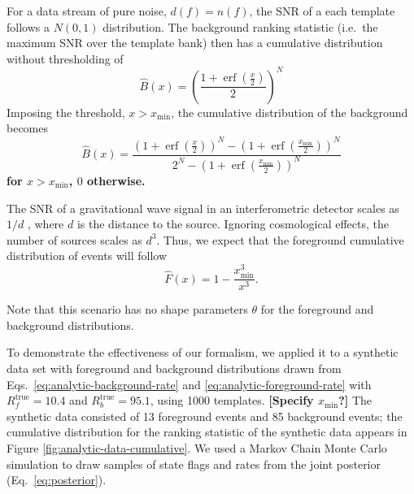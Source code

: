 \documentclass[aps,prd]{revtex4-1}
\newcommand{\xmin}{x_\mathrm{min}}
\newcommand{\ilya}[1]{{\color{red} \bf #1}}
\DeclareMathOperator{\erf}{erf}
\begin{document}
For a data stream of pure noise, $d(f) = n(f)$, the SNR of a each
template follows a $N(0,1)$ distribution.  The background ranking
statistic (i.e.\ the maximum SNR over the template bank) then has a
cumulative distribution without thresholding of
\begin{equation}
  \hat{B}(x) = \left( \frac{1 + \erf\left( \frac{x}{2}
      \right)}{2} \right)^N
\end{equation}
Imposing the threshold, $x > \xmin$, the
cumulative distribution of the background becomes
\begin{equation}
  \label{eq:analytic-background-rate}
  \hat{B}(x) = \frac{\left( 1 + \erf\left( \frac{x}{2} \right)
    \right)^N - \left( 1 + \erf\left( \frac{\xmin}{2} \right)
    \right)^N}{2^N - \left( 1 + \erf\left( \frac{\xmin}{2} \right)
    \right)^N }
\end{equation}
\ilya{for $x>\xmin$, $0$ otherwise.}

The SNR of a gravitational wave signal in an interferometric detector
scales as $1/d$ \citep{Finn1992}, where $d$ is the distance to the
source.  Ignoring cosmological effects, the number of sources scales
as $d^3$.  Thus, we expect that the foreground cumulative distribution
of events will follow
\begin{equation}
  \label{eq:analytic-foreground-rate}
  \hat{F}(x) = 1 - \frac{\xmin^3}{x^3}.
\end{equation}

Note that this scenario has no shape parameters $\theta$ for the foreground and
background distributions.

To demonstrate the effectiveness of our formalism, we applied it to a
synthetic data set with foreground and background distributions drawn
from Eqs.~\eqref{eq:analytic-background-rate} and
\eqref{eq:analytic-foreground-rate} with $R_f^\mathrm{true} = 10.4$
and $R_b^\mathrm{true} = 95.1$, using 1000 templates.  \ilya{[Specify
    $\xmin$?]} The synthetic data consisted of 13 foreground events
and 85 background events; the cumulative distribution for the ranking
statistic of the synthetic data appears in Figure
\ref{fig:analytic-data-cumulative}.  We used a Markov Chain Monte
Carlo simulation to draw samples of state flags and rates from the
joint posterior (Eq.~\eqref{eq:posterior}).
\end{document}
